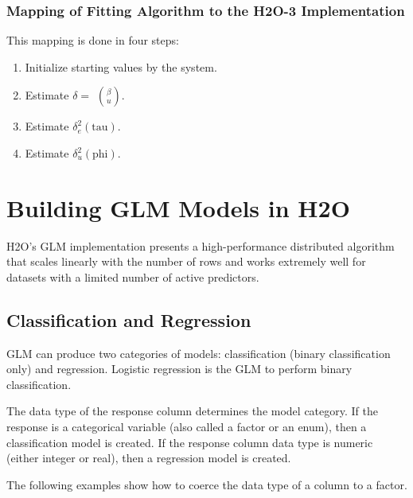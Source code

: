 \subsubsection{Mapping of Fitting Algorithm to the H2O-3 Implementation}

This mapping is done in four steps:

\begin{enumerate}
\item Initialize starting values by the system.
\item Estimate $\delta =$ $\beta \choose u$.
\item Estimate $\delta_e^2(\text {tau})$.
\item Estimate $\delta_u^2(\text {phi})$.
\end{enumerate}


\section{Building GLM Models in H2O}

H2O's GLM implementation presents a high-performance distributed algorithm that scales linearly with the number
of rows and works extremely well for datasets with a limited number of active predictors.

\subsection{Classification and Regression}

GLM can produce two categories of models: classification (binary classification only) and regression. Logistic regression is the GLM to perform binary classification.

The data type of the response column determines the model category.  If the response is a categorical variable
(also called a factor or an enum), then a classification model is created.  If the response column data type is
numeric (either integer or real), then a regression model is created. 

The following examples show how to coerce the data type of a column to a factor.

\waterExampleInR


\waterExampleInPython


